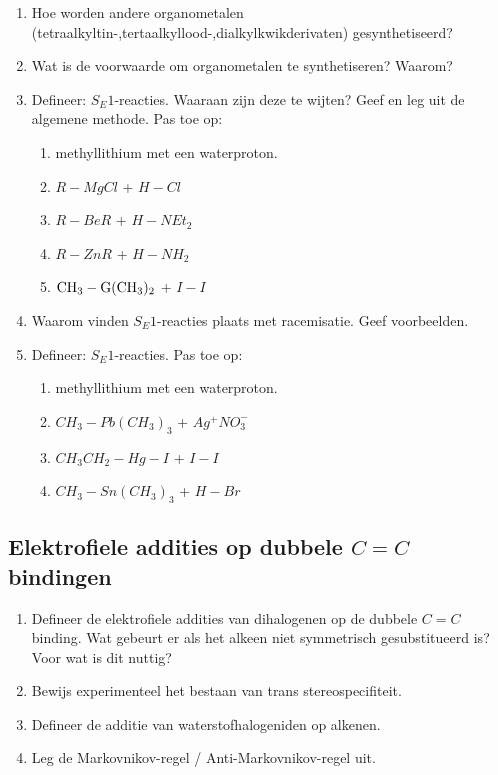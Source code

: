 \documentclass[a4paper,12pt]{article}
\begin{document}
\begin{enumerate}
        \item Hoe worden andere organometalen (tetraalkyltin-,tertaalkyllood-,dialkylkwikderivaten) gesynthetiseerd?
        \item Wat is de voorwaarde om organometalen te synthetiseren? Waarom?
        \item Defineer: $S_E1$-reacties. Waaraan zijn deze te wijten? Geef en leg uit de algemene methode. Pas toe op:
        \begin{enumerate}
            \item methyllithium met een waterproton.
            \item $R-MgCl$ + $H-Cl$ 
            \item $R-BeR$ + $H-NEt_2$
            \item $R-ZnR$ + $H-NH_2$
            \item $\ce{CH3}-\ce{G(CH3)_2}$ + $I-I$
        \end{enumerate}
        \item Waarom vinden $S_E1$-reacties plaats met racemisatie. Geef voorbeelden.
        \item Defineer: $S_E1$-reacties.  Pas toe op:
        \begin{enumerate}
            \item methyllithium met een waterproton.
            \item $CH_3-Pb(CH_3)_3$ + $Ag^+NO_3^-$ 
            \item $CH_3CH_2-Hg-I$ + $I-I$
            \item $CH_3-Sn(CH_3)_3$ + $H-Br$
        \end{enumerate}
    \end{enumerate}
    \subsection*{Elektrofiele addities op dubbele $C=C$ bindingen}
    \begin{enumerate}
        \item Defineer de elektrofiele addities van dihalogenen op de dubbele $C=C$ binding.  Wat gebeurt er als het alkeen niet symmetrisch gesubstitueerd is? Voor wat is dit nuttig?
        \item Bewijs experimenteel het bestaan van trans stereospecifiteit.
        \item Defineer de additie van waterstofhalogeniden op alkenen.
        \item Leg de Markovnikov-regel / Anti-Markovnikov-regel uit.
    \end{enumerate}
\end{document}
